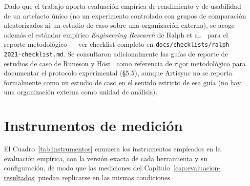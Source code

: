 Dado que el trabajo aporta evaluación empírica de rendimiento y de
usabilidad de un artefacto único (no un experimento controlado con grupos
de comparación aleatorizados ni un estudio de caso sobre una organización
externa), se acoge además el estándar empírico \emph{Engineering
Research} de Ralph et al.~\cite{RALPH2021} para el reporte metodológico
--- ver checklist completo en \texttt{docs/checklists/ralph-2021-checklist.md}.
Se consultaron adicionalmente las guías de reporte de estudios de caso de
Runeson y Höst~\cite{RUNESON2009} como referencia de rigor metodológico
para documentar el protocolo experimental (\S5.5), aunque Artisync no se
reporta formalmente como un estudio de caso en el sentido estricto de esa
guía (no hay una organización externa como unidad de análisis).

\section{Instrumentos de medición}

El Cuadro~\ref{tab:instrumentos} enumera los instrumentos empleados en la
evaluación empírica, con la versión exacta de cada herramienta y su
configuración, de modo que las mediciones del
Capítulo~\ref{cap:evaluacion-resultados} puedan replicarse en las mismas
condiciones.

